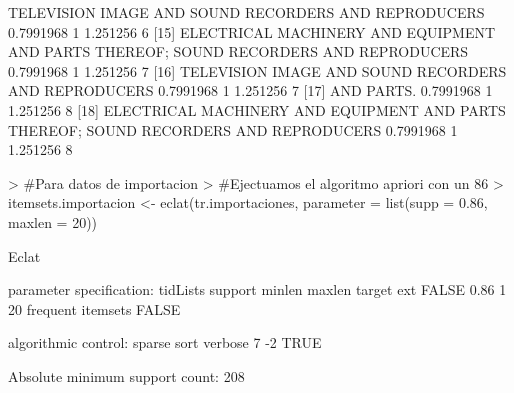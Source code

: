 \documentclass [a4paper] {article}
\begin{document}
{\begin{Schunk}
\begin{Soutput}
[14] {TELEVISION IMAGE AND SOUND RECORDERS AND REPRODUCERS}                                  0.7991968 1          1.251256 6      
[15] {ELECTRICAL MACHINERY AND EQUIPMENT AND PARTS THEREOF; SOUND RECORDERS AND REPRODUCERS} 0.7991968 1          1.251256 7      
[16] {TELEVISION IMAGE AND SOUND RECORDERS AND REPRODUCERS}                                  0.7991968 1          1.251256 7      
[17] {AND PARTS.}                                                                            0.7991968 1          1.251256 8      
[18] {ELECTRICAL MACHINERY AND EQUIPMENT AND PARTS THEREOF; SOUND RECORDERS AND REPRODUCERS} 0.7991968 1          1.251256 8      
\end{Soutput}
\begin{Sinput}
> #Para datos de importacion
> #Ejectuamos el algoritmo apriori con un 86% de soporte y un 90% de confianza
> itemsets.importacion <- eclat(tr.importaciones, parameter = list(supp = 0.86, maxlen = 20))
\end{Sinput}
\begin{Soutput}
Eclat

parameter specification:
 tidLists support minlen maxlen            target   ext
    FALSE    0.86      1     20 frequent itemsets FALSE

algorithmic control:
 sparse sort verbose
      7   -2    TRUE

Absolute minimum support count: 208 


\end{Soutput}
\end{Schunk}}
\end{document}
